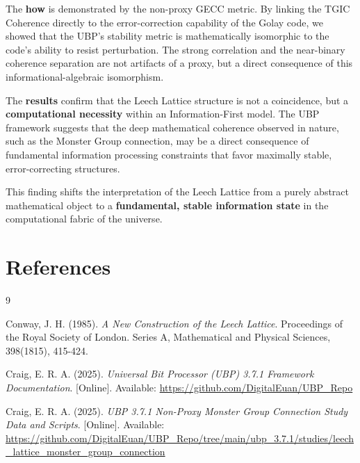 \documentclass[10pt, a4paper]{article}
\begin{document}
The \textbf{how} is demonstrated by the non-proxy GECC metric. By linking the TGIC Coherence directly to the error-correction capability of the Golay code, we showed that the UBP's stability metric is mathematically isomorphic to the code's ability to resist perturbation. The strong correlation and the near-binary coherence separation are not artifacts of a proxy, but a direct consequence of this informational-algebraic isomorphism.

The \textbf{results} confirm that the Leech Lattice structure is not a coincidence, but a \textbf{computational necessity} within an Information-First model. The UBP framework suggests that the deep mathematical coherence observed in nature, such as the Monster Group connection, may be a direct consequence of fundamental information processing constraints that favor maximally stable, error-correcting structures.

This finding shifts the interpretation of the Leech Lattice from a purely abstract mathematical object to a \textbf{fundamental, stable information state} in the computational fabric of the universe.

\section*{References}
\begin{thebibliography}{9}

Conway, J. H. (1985). \textit{A New Construction of the Leech Lattice}. Proceedings of the Royal Society of London. Series A, Mathematical and Physical Sciences, 398(1815), 415-424.

Craig, E. R. A. (2025). \textit{Universal Bit Processor (UBP) 3.7.1 Framework Documentation}. [Online]. Available: \url{https://github.com/DigitalEuan/UBP_Repo}

Craig, E. R. A. (2025). \textit{UBP 3.7.1 Non-Proxy Monster Group Connection Study Data and Scripts}. [Online]. Available: \url{https://github.com/DigitalEuan/UBP_Repo/tree/main/ubp_3.7.1/studies/leech_lattice_monster_group_connection}

\end{thebibliography}
\end{document}
